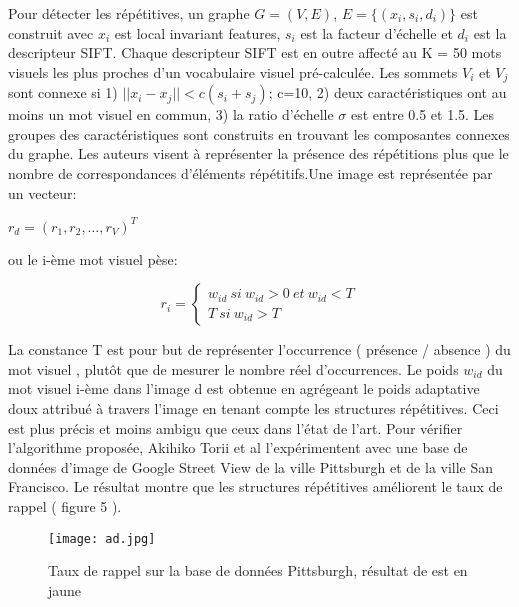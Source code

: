 \documentclass[journal]{IEEEtran}
\begin{document}
Pour détecter les répétitives, un graphe $G=(V,E)$,  $E=\{(x_i, s_i, d_i)\}$ est 
construit avec $x_i$ est local invariant features, $s_i$ est la facteur d'échelle et  
$d_i$ est la descripteur SIFT. Chaque descripteur SIFT est en outre affecté au K = 
50 mots visuels les plus proches d'un vocabulaire visuel pré-calculée. Les sommets $V_i$ 
et $V_j$ sont connexe si 1) $||x_i-x_j|| < c (s_i + s_j)$; c=10, 2) deux caractéristiques 
ont au moins un mot visuel en commun, 3) la ratio d'échelle $\sigma$ est entre 0.5 et 
1.5. Les groupes des caractéristiques sont construits en trouvant les composantes 
connexes du graphe. Les auteurs visent à représenter la présence des répétitions plus que 
le nombre de correspondances d'éléments répétitifs.Une image est représentée par 
un vecteur:
\begin{center}
	   $r_d=(r_1, r_2, \dots, r_V)^T$
\end{center}
  ou le i-ème mot visuel pèse:
\begin{center}
\begin{equation}
r_i=\begin{cases} 
	w_{id} \ si \  w_{id} > 0\ et\ w_{id} < T \\
	T\ si\ w_{id} > T
	\end{cases}
\end{equation}

\end{center}
La constance T est pour but de représenter l'occurrence ( présence / absence ) du mot 
visuel , plutôt que de mesurer le nombre réel d'occurrences. 
Le poids $w_{id}$ du mot visuel i-ème dans l'image d est obtenue en agrégeant le poids 
adaptative doux attribué à travers l'image en tenant compte les structures répétitives. 
Ceci est plus précis et moins ambigu que ceux dans l'état de l'art. 
Pour vérifier l'algorithme proposée, Akihiko Torii et al \cite{torii2013visual} 
l'expérimentent avec une base de données d'image de Google Street View de la ville 
Pittsburgh et de la ville San Francisco. Le résultat montre que les structures 
répétitives améliorent le taux de rappel ( figure 5 ).
\begin{figure}[t]
    \centering
    \texttt{[image: ad.jpg]}
    \label{fig:add}
    \caption{Taux de rappel sur la base de données Pittsburgh, résultat de 
\cite{torii2013visual} est en jaune} %
\end{figure}
\end{document}
